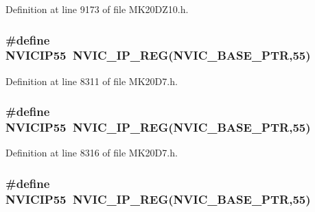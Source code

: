 Definition at line 9173 of file M\+K20\+D\+Z10.\+h.

\subsubsection[{\texorpdfstring{N\+V\+I\+C\+I\+P55}{NVICIP55}}]{\setlength{\rightskip}{0pt plus 5cm}\#define N\+V\+I\+C\+I\+P55~{\bf N\+V\+I\+C\+\_\+\+I\+P\+\_\+\+R\+EG}({\bf N\+V\+I\+C\+\_\+\+B\+A\+S\+E\+\_\+\+P\+TR},55)}\hypertarget{group___n_v_i_c___register___accessor___macros_ga6de43c0c4d33f426892d6bde0d444006}{}\label{group___n_v_i_c___register___accessor___macros_ga6de43c0c4d33f426892d6bde0d444006}


Definition at line 8311 of file M\+K20\+D7.\+h.

\subsubsection[{\texorpdfstring{N\+V\+I\+C\+I\+P55}{NVICIP55}}]{\setlength{\rightskip}{0pt plus 5cm}\#define N\+V\+I\+C\+I\+P55~{\bf N\+V\+I\+C\+\_\+\+I\+P\+\_\+\+R\+EG}({\bf N\+V\+I\+C\+\_\+\+B\+A\+S\+E\+\_\+\+P\+TR},55)}\hypertarget{group___n_v_i_c___register___accessor___macros_ga6de43c0c4d33f426892d6bde0d444006}{}\label{group___n_v_i_c___register___accessor___macros_ga6de43c0c4d33f426892d6bde0d444006}


Definition at line 8316 of file M\+K20\+D7.\+h.

\subsubsection[{\texorpdfstring{N\+V\+I\+C\+I\+P55}{NVICIP55}}]{\setlength{\rightskip}{0pt plus 5cm}\#define N\+V\+I\+C\+I\+P55~{\bf N\+V\+I\+C\+\_\+\+I\+P\+\_\+\+R\+EG}({\bf N\+V\+I\+C\+\_\+\+B\+A\+S\+E\+\_\+\+P\+TR},55)}\hypertarget{group___n_v_i_c___register___accessor___macros_ga6de43c0c4d33f426892d6bde0d444006}{}\label{group___n_v_i_c___register___accessor___macros_ga6de43c0c4d33f426892d6bde0d444006}


